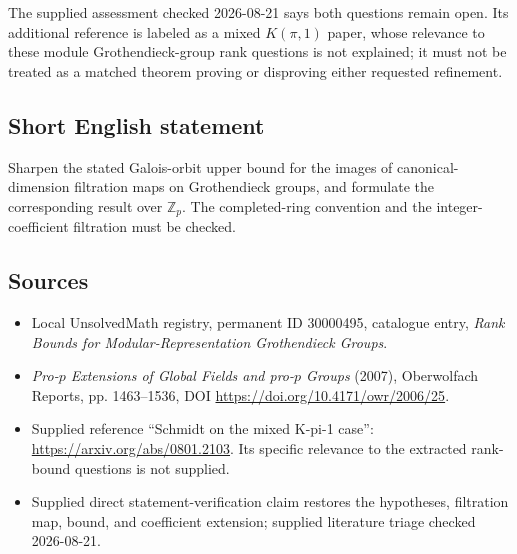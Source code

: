 \documentclass[11pt]{article}
\newcommand{\Z}{\mathbb{Z}}
\begin{document}
The supplied assessment checked 2026-08-21 says both questions remain open. Its additional reference is labeled as a mixed \(K(\pi,1)\) paper, whose relevance to these module Grothendieck-group rank questions is not explained; it must not be treated as a matched theorem proving or disproving either requested refinement.
\subsection{Short English statement}
Sharpen the stated Galois-orbit upper bound for the images of canonical-dimension filtration maps on Grothendieck groups, and formulate the corresponding result over \(\Z_p\). The completed-ring convention and the integer-coefficient filtration must be checked.
\subsection{Sources}
\begin{itemize}
\item Local UnsolvedMath registry, permanent ID 30000495, catalogue entry, \emph{Rank Bounds for Modular-Representation Grothendieck Groups}.
\item \emph{Pro-\(p\) Extensions of Global Fields and pro-\(p\) Groups} (2007), Oberwolfach Reports, pp. 1463--1536, DOI \url{https://doi.org/10.4171/owr/2006/25}.
\item Supplied reference ``Schmidt on the mixed K-pi-1 case'': \url{https://arxiv.org/abs/0801.2103}. Its specific relevance to the extracted rank-bound questions is not supplied.
\item Supplied direct statement-verification claim restores the hypotheses, filtration map, bound, and coefficient extension; supplied literature triage checked 2026-08-21.
\end{itemize}
\end{document}

